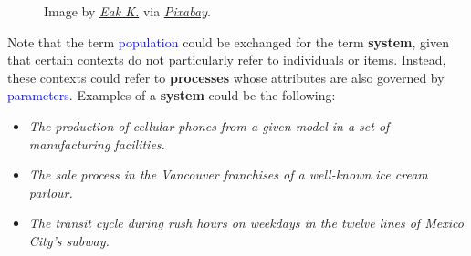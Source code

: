 \documentclass[
  letterpaper,
  DIV=11,
  numbers=noendperiod]{scrreprt}
\providecommand{\tightlist}{%
  \setlength{\itemsep}{0pt}\setlength{\parskip}{0pt}}\usepackage{longtable,booktabs,array}
\begin{document}
\begin{tcolorbox}
\begin{figure}[H]
{}

\caption{Image by
\href{https://pixabay.com/users/eak_kkk-907811/?utm_source=link-attribution&utm_medium=referral&utm_campaign=image&utm_content=1044891}{\emph{Eak
K.}} via
\href{https://pixabay.com/photos/lego-toys-figurines-crowd-many-1044891/}{\emph{Pixabay}}.}

\end{figure}%

Note that the term \textcolor{blue}{population} could be exchanged for
the term \textbf{system}, given that certain contexts do not
particularly refer to individuals or items. Instead, these contexts
could refer to \textbf{processes} whose attributes are also governed by
\textcolor{blue}{parameters}. Examples of a \textbf{system} could be the
following:

\begin{itemize}
\tightlist
\item
  \emph{The production of cellular phones from a given model in a set of
  manufacturing facilities.}
\item
  \emph{The sale process in the Vancouver franchises of a well-known ice
  cream parlour.}
\item
  \emph{The transit cycle during rush hours on weekdays in the twelve
  lines of Mexico City's subway.}
\end{itemize}

\end{tcolorbox}
\end{document}
